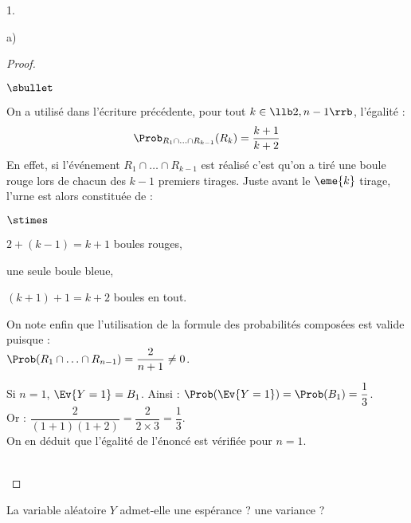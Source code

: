 \documentclass[11pt]{article}%
\begin{document}
\begin{noliste}{1.}
\begin{noliste}{a)}
\begin{proof}
\begin{noliste}{$\sbullet$}
      \item On a utilisé dans l'écriture précédente, pour tout $k
        \in \llb 2, n-1 \rrb$, l'égalité :
        \[
        \Prob_{R_1 \cap \ldots \cap R_{k-1}}(R_k) = \dfrac{k+1}{k+2}
        \]
        En effet, si l'événement $R_1 \cap \ldots \cap R_{k-1}$ est
        réalisé c'est qu'on a tiré une boule rouge lors de chacun des
        $k-1$ premiers tirages. Juste avant le $\eme{k}$ tirage,
        l'urne est alors constituée de :
        \begin{noliste}{$\stimes$}
        \item $2 + (k-1) = k+1$ boules rouges,
        \item une seule boule bleue,
        \item $(k+1) + 1 = k+2$ boules en tout.
        \end{noliste}

      \item On note enfin que l'utilisation de la formule des
        probabilités composées est valide puisque : \\[.1cm]
        $\Prob(R_1 \cap
        \ldots \cap R_{n-1}) = \dfrac{2}{n+1} \neq 0$.
        
       \item Si $n = 1$, $\Ev{Y = 1} = B_1$. Ainsi : $\Prob(\Ev{Y = 1})
        = \Prob(B_1) = \dfrac{1}{3}$.\\
        Or : $\dfrac{2}{(1+1)(1+2)} = \dfrac{2}{2 \times 3} =
        \dfrac{1}{3}$.\\[.2cm]
        On en déduit que l'égalité de l'énoncé est vérifiée pour $n =
        1$.
      \end{noliste}
      ~\\[-1cm]
    \end{proof}




  \item La variable aléatoire $Y$ admet-elle une espérance ? une
    variance ?
    

\end{noliste}
\end{noliste}
\end{document}
